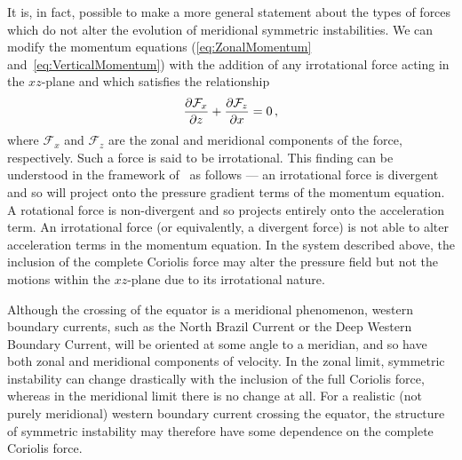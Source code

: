     It is, in fact, possible to make a more general statement about the types of forces which do not alter the evolution of meridional symmetric instabilities. We can modify the momentum equations (\ref{eq:ZonalMomentum} and~\ref{eq:VerticalMomentum}) with the addition of any irrotational force acting in the $xz$-plane and which satisfies the relationship
    \begin{equation}
        \pdv{\mathcal{F}_x}{z} + \pdv{\mathcal{F}_z}{x} = 0 \, ,
    \end{equation}
    where $\mathcal{F}_x$ and $\mathcal{F}_z$ are the zonal and meridional components of the force, respectively. Such a force is said to be irrotational. This finding can be understood in the framework of~\citet{Marshall2011} as follows --- an irrotational force is divergent and so will project onto the pressure gradient terms of the momentum equation. A rotational force is non-divergent and so projects entirely onto the acceleration term. An irrotational force (or equivalently, a divergent force) is not able to alter acceleration terms in the momentum equation. In the system described above, the inclusion of the complete Coriolis force may alter the pressure field but not the motions within the $xz$-plane due to its irrotational nature.

    Although the crossing of the equator is a meridional phenomenon, western boundary currents, such as the North Brazil Current or the Deep Western Boundary Current, will be oriented at some angle to a meridian, and so have both zonal and meridional components of velocity. In the zonal limit, symmetric instability can change drastically with the inclusion of the full Coriolis force, whereas in the meridional limit there is no change at all. For a realistic (not purely meridional) western boundary current crossing the equator, the structure of symmetric instability may therefore have some dependence on the complete Coriolis force.
    
